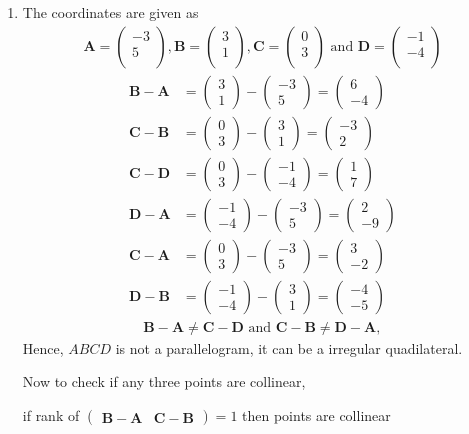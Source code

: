 \documentclass[12pt]{article}
\newcommand{\myvec}[1]{\ensuremath{\begin{pmatrix}#1\end{pmatrix}}}
\let\vec\mathbf
\begin{document}
\begin{enumerate}
\item The coordinates are given as
	\begin{align}
	\vec{A} = \myvec{
		-3\\
		5\\
		},
	\vec{B} = \myvec{
		3\\
		1\\
		},
	\vec{C} = \myvec{
		0\\
		3\\
		} \text{ and }
	\vec{D} = \myvec{
		-1\\
		-4\\
		}
	\end{align}
	\begin{align}
		\vec{B} - \vec{A} &= \myvec{3\\1} - \myvec{-3\\5} = \myvec{6\\-4}\\
		\vec{C} - \vec{B} &= \myvec{0\\3} - \myvec{3\\1} = \myvec{-3\\2}\\
		\vec{C} - \vec{D} &= \myvec{0\\3} - \myvec{-1\\-4} = \myvec{1\\7}\\
		\vec{D} - \vec{A} &= \myvec{-1\\-4} - \myvec{-3\\5} = \myvec{2\\-9}\\
		\vec{C} - \vec{A} &= \myvec{0\\3} - \myvec{-3\\5} = \myvec{3\\-2}\\
		\vec{D} - \vec{B} &= \myvec{-1\\-4} - \myvec{3\\1} = \myvec{-4\\-5}
	\end{align}
	\begin{align}
	\vec{B}-\vec{A} \neq \vec{C}-\vec{D} \text{ and } \vec{C}-\vec{B} \neq \vec{D}-\vec{A},
	\end{align}
	Hence, $ABCD$ is not a parallelogram, it can be a irregular quadilateral.

	Now to check if any three points are collinear,

	if rank of $\myvec{\vec{B}-\vec{A} & \vec{C}-\vec{B}} = 1$ then points are collinear


\end{enumerate}
\end{document}
